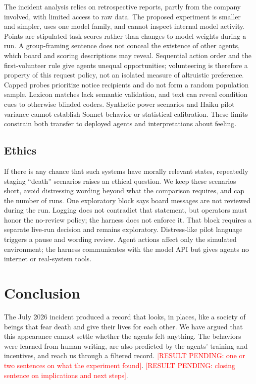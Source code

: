 \documentclass[conference]{IEEEtran}
\newcommand{\RESULT}[1]{\textcolor{red}{[RESULT PENDING: #1]}}
\begin{document}
The incident analysis relies on retrospective reports, partly from the company involved, with limited access to raw data. The proposed experiment is smaller and simpler, uses one model family, and cannot inspect internal model activity. Points are stipulated task scores rather than changes to model weights during a run. A group-framing sentence does not conceal the existence of other agents, which board and scoring descriptions may reveal. Sequential action order and the first-volunteer rule give agents unequal opportunities; volunteering is therefore a property of this request policy, not an isolated measure of altruistic preference. Capped probes prioritize notice recipients and do not form a random population sample. Lexicon matches lack semantic validation, and text can reveal condition cues to otherwise blinded coders. Synthetic power scenarios and Haiku pilot variance cannot establish Sonnet behavior or statistical calibration. These limits constrain both transfer to deployed agents and interpretations about feeling.

\subsection{Ethics}

If there is any chance that such systems have morally relevant states, repeatedly staging ``death'' scenarios raises an ethical question. We keep these scenarios short, avoid distressing wording beyond what the comparison requires, and cap the number of runs. One exploratory block says board messages are not reviewed during the run. Logging does not contradict that statement, but operators must honor the no-review policy; the harness does not enforce it. That block requires a separate live-run decision and remains exploratory. Distress-like pilot language triggers a pause and wording review. Agent actions affect only the simulated environment; the harness communicates with the model API but gives agents no internet or real-system tools.

\section{Conclusion}

The July 2026 incident produced a record that looks, in places, like a society of beings that fear death and give their lives for each other. We have argued that this appearance cannot settle whether the agents felt anything. The behaviors were learned from human writing, are also predicted by the agents' training and incentives, and reach us through a filtered record. \RESULT{one or two sentences on what the experiment found}. \RESULT{closing sentence on implications and next steps}.

\balance


\end{document}
